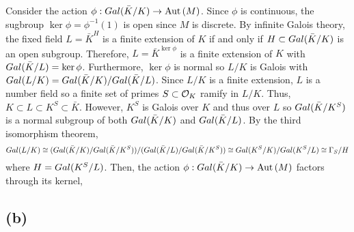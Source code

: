 \documentclass[12pt]{extarticle}
\begin{document}
Consider the action $\phi : Gal \small(\bar{K}/K \small) \to \mathrm{Aut}\left( M \right)$. Since $\phi$ is continuous, the sugbroup $\ker{\phi} = \phi^{-1}(1)$ is open since $M$ is discrete. By infinite Galois theory, the fixed field $L = \bar{K}^{H}$ is a finite extension of $K$ if and only if $H \subset Gal \small(\bar{K}/K \small)$ is an open subgroup. Therefore, $L = \bar{K}^{\ker{\phi}}$ is a finite extension of $K$ with $Gal \small(\bar{K}/L \small) = \ker{\phi}$. Furthermore, $\ker{\phi}$ is normal so $L/K$ is Galois with $Gal \small(L/K \small) = Gal \small(\bar{K}/K \small) / Gal \small(\bar{K}/L \small)$. Since $L / K$ is a finite extension, $L$ is a number field so a finite set of primes $S \subset \mathcal{O}_{K}$ ramify in $L/K$. Thus, $K \subset L \subset K^S \subset \bar{K}$. However, $K^S$ is Galois over $K$ and thus over $L$ so $Gal \small(\bar{K}/K^S \small)$ is a normal subgroup of both $Gal \small(\bar{K}/K \small)$ and $Gal \small(\bar{K}/L \small)$. By the third isomorphism theorem,
\[ Gal \small(L/K \small) \cong (Gal \small(\bar{K}/K \small)/Gal \small(\bar{K}/K^S \small)) / (Gal \small(\bar{K}/L \small) / Gal \small(\bar{K}/K^S \small)) \cong Gal \small(K^S / K \small) / Gal \small(K^S / L \small) \cong \Gamma_S / H \]
where $H = Gal \small(K^S / L \small)$. Then, the action $\phi : Gal \small(\bar{K}/K \small) \to \mathrm{Aut}\left( M \right)$ factors through its kernel,
\begin{center}
\end{center}

\subsection*{(b)}
\end{document}
